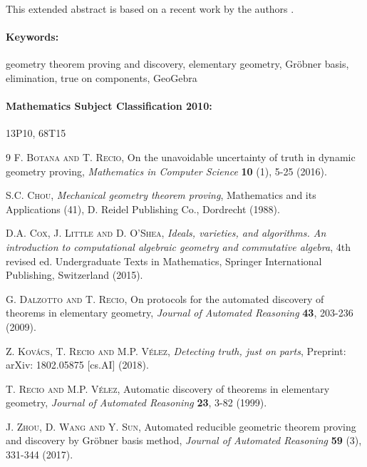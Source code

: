 \documentclass{article}
\newcommand{\KEYWORDS}[1]{\paragraph{Keywords:} #1}
\newcommand{\MSCLASSIFICATION}[1]{\paragraph{Mathematics Subject Classification 2010:} #1}
\begin{document}
This extended abstract is  based on a recent work by the authors  \cite{KRV}.



\KEYWORDS{geometry theorem proving and discovery, elementary geometry, Gr\"obner basis, elimination, true on components, GeoGebra}


\MSCLASSIFICATION{13P10, 68T15}





\begin{thebibliography}{9}
\textsc{F. Botana and T. Recio}, On the unavoidable uncertainty of truth in dynamic geometry proving, \emph{Mathematics in Computer Science} \textbf{10} (1), 5-25 (2016).

\textsc{S.C. Chou}, \emph{Mechanical geometry theorem proving}, Mathematics and its
  Applications (41), D. Reidel Publishing Co., Dordrecht (1988).
  
\textsc{D.A. Cox, J. Little and D. O'Shea}, \emph{Ideals, varieties, and algorithms. An
  introduction to computational algebraic geometry and commutative algebra}, 4th
  revised ed. Undergraduate Texts in Mathematics, Springer International Publishing, Switzerland (2015).

\textsc{G. Dalzotto and T. Recio}, On protocols for the automated discovery of theorems in elementary geometry, \emph{Journal of Automated Reasoning} \textbf{43}, 203-236 (2009).
  

\textsc{Z. Kov\'acs,  T. Recio and  M.P. V\'elez}, \textit{Detecting truth,  just on parts}, Preprint: arXiv: 1802.05875  [cs.AI] (2018).

\textsc{T. Recio and  M.P. V\'elez},  Automatic discovery of theorems in elementary geometry, \emph{Journal of Automated Reasoning} \textbf{23}, 3-82 (1999).

\textsc{J. Zhou, D. Wang and Y. Sun},  Automated reducible geometric theorem proving and discovery by Gr\"obner basis method, \emph{Journal of Automated Reasoning}  \textbf{59} (3), 331-344 (2017).

  
\end{thebibliography}
\end{document}
